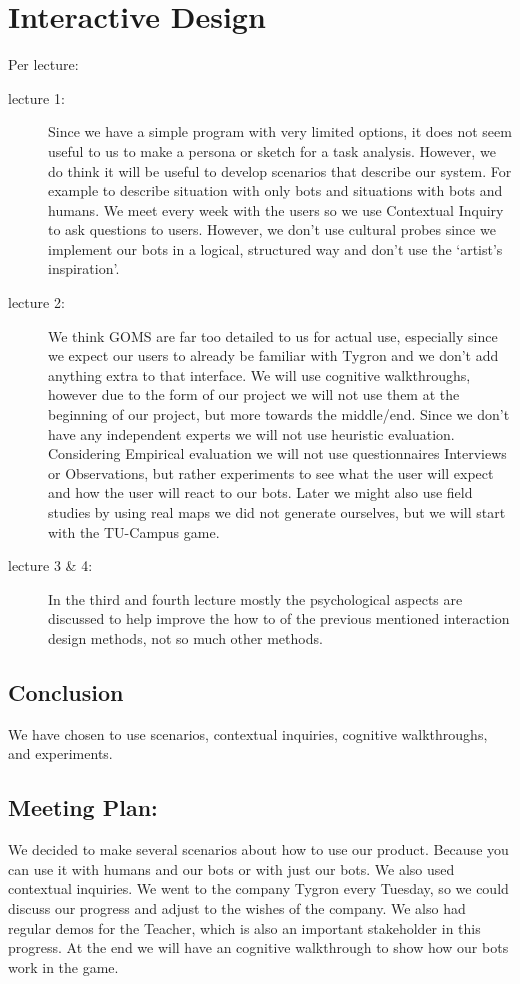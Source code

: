 \section{Interactive Design}

Per lecture:

\begin{description}

\item[lecture 1:]
Since we have a simple program with very limited options, it does not seem useful to us to make a persona or sketch for a task analysis.
However, we do think it will be useful to develop scenarios that describe our system. For example to describe situation with only bots and situations with bots and humans.
We meet every week with the users so we use Contextual Inquiry to ask questions to users. However, we don’t use cultural probes since we implement our bots in a logical, structured way and don’t use the ‘artist’s inspiration’.

\item[lecture 2:]
We think GOMS are far too detailed to us for actual use, especially since we expect our users to already be familiar with Tygron and we don’t add anything extra to that interface. 
We will use cognitive walkthroughs, however due to the form of our project we will not use them at the beginning of our project, but more towards the middle/end. 
Since we don’t have any independent experts we will not use heuristic evaluation. 
Considering Empirical evaluation we will not use questionnaires Interviews or Observations, but rather experiments to see what the user will expect and how the user will react to our bots. Later we might also use field studies by using real maps we did not generate ourselves, but we will start with the TU-Campus game.


\item[lecture 3 \& 4:]
In the third and fourth lecture mostly the psychological aspects are discussed to help improve the how to of the previous mentioned interaction design methods, not so much other methods.

\end{description}

\subsection{Conclusion}
We have chosen to use scenarios, contextual inquiries, cognitive walkthroughs, and experiments.

\subsection{Meeting Plan:}
We decided to make several scenarios about how to use our product. Because you can use it with humans and our bots or with just our bots. 
We also used contextual inquiries. We went to the company Tygron every Tuesday, so we could discuss our progress and adjust to the wishes of the company. We also had regular demos for the Teacher, which is also an important stakeholder in this progress. At the end we will have an cognitive walkthrough to show how our bots work in the game.  